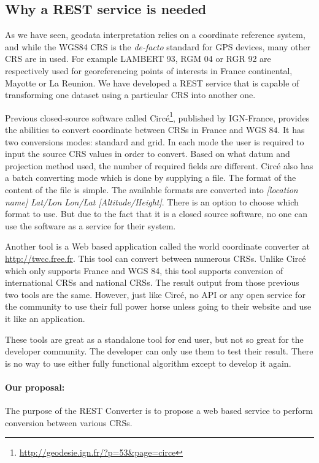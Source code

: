 


\subsection{Why a REST service is needed}
As we have seen, geodata interpretation relies on a coordinate reference system, and while the WGS84 CRS is the \textit{de-facto} standard for GPS devices, many other CRS are in used. For example LAMBERT 93, RGM 04 or RGR 92 are respectively used for georeferencing points of interests in France continental, Mayotte or La Reunion. We have developed a REST service that is capable of transforming one dataset using a particular CRS into another one. 

Previous closed-source software called Circ\'e\footnote{\url{http://geodesie.ign.fr/?p=53&page=circe}}, published by IGN-France, provides the abilities to convert coordinate between CRSs in France and WGS 84. It has two conversions modes: standard and grid. In each mode the user is required to input the source CRS values in order to convert. Based on what datum and projection method used, the number of required fields are different. 
Circ\'e also has a batch converting mode which is done by supplying a file. The format of the content of the file is simple. The available formats are converted into \textsl{[location name] {Lat/Lon} {Lon/Lat} [Altitude/Height]}. There is an option to choose which format to use. But due to the fact that it is a closed source software, no one can use the software as a service for their system.

Another tool is a Web based application called the world coordinate converter at \url{http://twcc.free.fr}. This tool can convert between numerous CRSs. Unlike Circ\'e which only supports France and WGS 84, this tool supports conversion of international CRSs and national CRSs. The result output from those previous two tools are the same. However, just like Circ\'e, no API or any open service for the community to use their full power horse unless going to their website and use it like an application.

These tools are great as a standalone tool for end user, but not so great for the developer community. The developer can only use them to test their result. There is no  way to use either fully functional algorithm except to develop it again.

 
\paragraph{Our proposal:} The purpose of the REST Converter is to propose a web based service to perform conversion between various CRSs.

